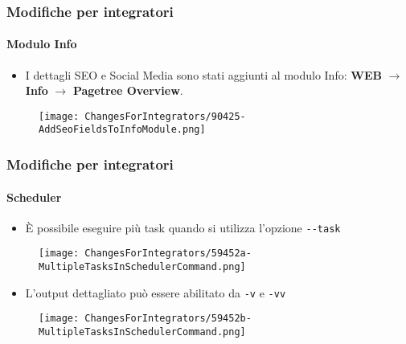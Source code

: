 
\begin{frame}[fragile]
	\frametitle{Modifiche per integratori}
	\framesubtitle{Modulo Info}

	\begin{itemize}
		\item I dettagli SEO e Social Media sono stati aggiunti al modulo Info:\newline
			\textbf{WEB} $\rightarrow$ \textbf{Info} $\rightarrow$ \textbf{Pagetree Overview}.
	\end{itemize}

	\begin{figure}
		\texttt{[image: ChangesForIntegrators/90425-AddSeoFieldsToInfoModule.png]}
	\end{figure}

\end{frame}


\begin{frame}[fragile]
	\frametitle{Modifiche per integratori}
	\framesubtitle{Scheduler}

	\lstset{basicstyle=\tiny\ttfamily}

	\begin{itemize}
		\item È possibile eseguire più task quando si utilizza l'opzione \texttt{-}\texttt{-}\texttt{task}
	\end{itemize}

	\begin{figure}
		\texttt{[image: ChangesForIntegrators/59452a-MultipleTasksInSchedulerCommand.png]}
	\end{figure}

	\begin{itemize}
		\item L'output dettagliato può essere abilitato da \texttt{-}\texttt{v} e \texttt{-}\texttt{vv}
	\end{itemize}

	\begin{figure}
		\texttt{[image: ChangesForIntegrators/59452b-MultipleTasksInSchedulerCommand.png]}
	\end{figure}

\end{frame}

